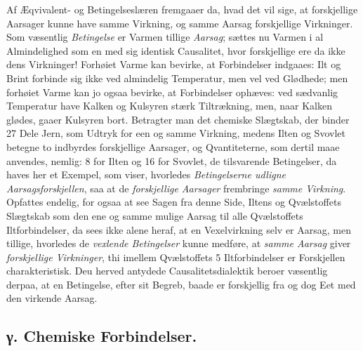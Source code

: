 \documentclass[12pt,a4paper]{book}
\begin{document}
Af Æqvivalent- og Betingelseslæren fremgaaer da, hvad det vil
sige, at forskjellige Aarsager kunne have samme Virkning, og samme
Aarsag forskjellige Virkninger. Som væsentlig \emph{Betingelse} er
Varmen tillige \emph{Aarsag}; sættes nu Varmen i al Almindelighed
som en med sig identisk Causalitet, hvor forskjellige ere da ikke
dens Virkninger! Forhøiet Varme kan bevirke, at Forbindelser
indgaaes: Ilt og Brint forbinde sig ikke ved almindelig Temperatur,
men vel ved Glødhede; men forhøiet Varme kan jo ogsaa bevirke, at
Forbindelser ophæves: ved sædvanlig Temperatur have Kalken og
Kulsyren stærk Tiltrækning, men, naar Kalken glødes, gaaer Kulsyren
bort. Betragter man det chemiske Slægtskab, der binder 27 Dele
Jern, som Udtryk for een og samme Virkning, medens Ilten og Svovlet
betegne to indbyrdes forskjellige Aarsager, og Qvantiteterne, som
dertil maae anvendes, nemlig: 8 for Ilten
og 16 for Svovlet, de tilsvarende Betingelser, da haves her et
Exempel, som viser, hvorledes \emph{Betingelserne udligne
Aarsagsforskjellen}, saa at de \emph{forskjellige Aarsager}
frembringe \emph{samme Virkning}. Opfattes endelig, for ogsaa at
see Sagen fra denne Side, Iltens og Qvælstoffets Slægtskab som den
ene og samme mulige Aarsag til alle Qvælstoffets Iltforbindelser,
da sees ikke alene heraf, at en Vexelvirkning selv er Aarsag, men
tillige, hvorledes de \emph{vexlende Betingelser} kunne medføre, at
\emph{samme Aarsag} giver \emph{forskjellige Virkninger}, thi
imellem Qvælstoffets 5 Iltforbindelser er Forskjellen
charakteristisk. Deu herved antydede Causalitetsdialektik beroer
væsentlig derpaa, at en Betingelse, efter sit Begreb, baade er
forskjellig fra og dog Eet med den virkende Aarsag.

\subsection*{γ. Chemiske Forbindelser.}
\end{document}

